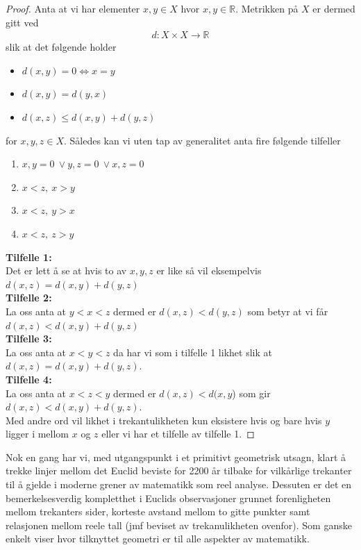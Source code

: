 \documentclass[12pt,
               a4paper,
               article,
               oneside,
               oldfontcommands,
               norsk]{memoir}
\begin{document}
\begin{proof}
  Anta at vi har elementer $x, y \in X$ hvor $x, y \in \mathbb{R}$. Metrikken på $X$ er dermed gitt ved 
\begin{align*}
d: X \times X \rightarrow \mathbb{R}
\end{align*}
slik at det følgende holder 
\begin{itemize}
  \item $d(x,y) = 0 \iff x = y$ 
  \item $d(x,y) = d(y,x)$
  \item $d(x,z) \leq d(x,y) + d(y,z)$
\end{itemize}
for $x,y,z \in X$. Således kan vi uten tap av generalitet anta fire følgende tilfeller
\begin{enumerate}
  \item $x, y = 0 \ \lor y,z = 0 \ \lor x,z = 0$ 
  \item $x < z, \ x > y$
  \item $x < z, \ y > x$
  \item $x < z, \ z > y$
\end{enumerate}\vspace{3mm}
\textbf{Tilfelle 1:} \vspace{3mm}\\ 
Det er lett å se at hvis to av $x,y,z$ er like så vil eksempelvis $d(x,z) = d(x,y) + d(y,z)$ \vspace{3mm}\\ 
\textbf{Tilfelle 2:}\vspace{3mm}\\ 
La oss anta at $y < x < z$  dermed er $d(x, z) < d(y,z)$ som betyr at vi får $d(x,z) < d(x,y) + d(y,z)$ \vspace{3mm}\\ 
\textbf{Tilfelle 3:}\vspace{3mm}\\
La oss anta at $x < y < z$ da har vi som i tilfelle 1 likhet slik at $d(x,z) = d(x,y) + d(y,z)$. \vspace{3mm}\\ 
\textbf{Tilfelle 4:}\vspace{3mm}\\ 
La oss anta at $x < z < y$ dermed er $d(x,z) < d(x,y$) som gir $d(x,z) < d(x,y) + d(y,z)$. \vspace{4mm}\\ 
Med andre ord vil likhet i trekantulikheten kun eksistere hvis og bare hvis $y$ ligger i mellom $x$ og $z$ eller vi har et tilfelle av tilfelle 1.
\end{proof}
Nok en gang har vi, med utgangspunkt i et primitivt geometrisk utsagn, klart å trekke linjer mellom det Euclid beviste for 2200 år tilbake for vilkårlige trekanter til å gjelde i moderne grener av matematikk som reel analyse. Dessuten er det en bemerkelsesverdig kompletthet i Euclids observasjoner grunnet forenligheten mellom trekanters sider, korteste avstand mellom to gitte punkter samt relasjonen mellom reele tall (jmf beviset av trekanulikheten ovenfor). Som ganske enkelt viser hvor tilknyttet geometri er til alle aspekter av matematikk. 
\end{document}
